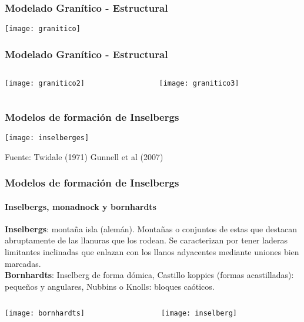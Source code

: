\documentclass{beamer}
\begin{document}
\begin{frame}
\frametitle{Modelado Granítico - Estructural}
\begin{center}
\texttt{[image: granitico]}
\end{center}
\end{frame}
\begin{frame}
\frametitle{Modelado Granítico - Estructural}
\begin{columns}
	\begin{column}{.5\linewidth}
	\centering
	\texttt{[image: granitico2]}
	\end{column}
	\begin{column}{.5\linewidth}
	\centering
	\texttt{[image: granitico3]}
	\end{column}
\end{columns}
\end{frame}
\begin{frame}
\frametitle{Modelos de formación de Inselbergs}
\begin{center}
\texttt{[image: inselberges]}
\end{center}
\tiny{Fuente: Twidale (1971) Gunnell et al (2007)}
\end{frame}
\begin{frame}
\frametitle{Modelos de formación de Inselbergs}
\framesubtitle{Inselbergs, monadnock y bornhardts}
\small{
\textbf{Inselbergs}: montaña isla (alemán). Montañas o conjuntos de estas que destacan abruptamente de las llanuras que los rodean. Se caracterizan por tener laderas limitantes inclinadas que enlazan con los llanos adyacentes mediante uniones bien marcadas.\\
\textbf{Bornhardts}: Inselberg de forma dómica, Castillo koppies (formas acastilladas): pequeños y angulares, Nubbins o Knolls: bloques caóticos.
}
\begin{columns}
	\begin{column}{.5\linewidth}
	\begin{center}
	\texttt{[image: bornhardts]}
	\end{center}
	\end{column}
	\begin{column}{.5\linewidth}
	\begin{center}
	\texttt{[image: inselberg]}
	\end{center}
	\end{column}
\end{columns}
\end{frame}
\end{document}
